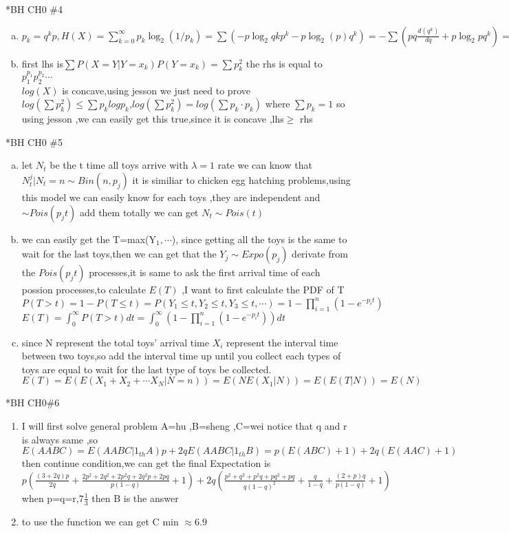 \documentclass{article}
\begin{document}
\begin{homeworkProblem}*{BH CH0 \#4}
	\begin{enumerate}[(a)]
		\item $p_k=q^{k}p,H(X)=\sum_{k=0}^{\infty}p_k \log_{2}(1/p_k)=\sum(-p\log_2q kp^{k}-p\log_2(p)q^{k})=-\sum( pq\frac{d(q^{k})}{dq}+p\log_2 p q^{k})=-\frac{q}{p}\log_2 q-\log_2p$
		\item first lhs is$\sum P(X=Y|Y=x_k)P(Y=x_k)=\sum p_k^{2}$ the rhs is equal to $p_1^{p_1}p_2^{p_2}\cdots$\\ $log(X)$ is concave,using jesson we just need to prove $log(\sum p_k^{2})\leq \sum p_klogp_k$,$log(\sum p_k^{2})=log(\sum p_k\cdot p_k)$ where $\sum p_k=1$ so using jesson ,we can easily get this true,since it is concave ,lhs$\geq$ rhs
\end{enumerate}
\end{homeworkProblem}
\begin{homeworkProblem}*{BH CH0 \#5}
	\begin{enumerate}[(a)]
	\item let $N_t$ be the t time all toys arrive with $\lambda=1$ rate  we can know that $N_t^{j}|N_t=n\sim Bin(n,p_j)$ it is similiar to chicken egg hatching problems,using this model we can easily know for each toys ,they are independent and $\sim Pois(p_jt)$ add them totally we can get $N_{t}\sim Pois(t)$
	\item  we can easily get the T=max(Y$_1,\cdots$), since getting all the toys is the same to wait for the last toys,then we can get that the $Y_j\sim Expo(p_j)$ derivate from the $Pois(p_j t)$ processes,it is same to ask the first arrival time of each possion processes,to calculate $E(T)$ ,I want to first calculate the PDF of T$P(T>t)=1-P(T\leq t)=P(Y_1\leq t,Y_2\leq t,Y_3 \leq t,\cdots)=1-\prod_{i=1}^{n}(1-e^{-p_i t})$
	$E(T)=\int_{0}^{\infty}P(T>t)dt=\int_{0}^{\infty}(1-\prod_{i=1}^{n}(1-e^{-p_i t}))dt$ 
	\item since N represent the total toys' arrival time $X_i$ represent the interval time between two toys,so add the interval time up until you collect each types of toys are equal to wait for the last type of toys be collected.$E(T)=E(E(X_1+X_2+\cdots X_N|N=n))=E(NE(X_1|N))=E(E(T|N))=E(N)$
	\end{enumerate}
\end{homeworkProblem}
\begin{homeworkProblem}*{BH CH0\#6}
	\begin{enumerate}
		\item I will first solve general problem  A=hu ,B=sheng ,C=wei notice that  q and r is always same ,so $E(AABC)=E(AABC|1_{th} A)p+2qE(AABC|1_{th}B)=p(E(ABC)+1)+2q(E(AAC)+1)$ then continue condition,we can get the final Expectation is $p(\frac{(3+2q)p}{2q}+\frac{2p^{2}+2q^{2}+2p^{2}q+2q^{2}p+2pq}{p(1-q)}+1)+2q(\frac{p^{2}+q^{2}+p^{2}q+pq^{2}+pq}{q(1-q)^{2}}+\frac{q}{1-q}+\frac{(2+p)q}{p(1-q)}+1)$
		when p=q=r,$7\frac{1}{3}$ then B is the answer
	\item to use the function we can get C min $\approx 6.9$
	\end{enumerate}
	
\end{homeworkProblem}
\end{document}
